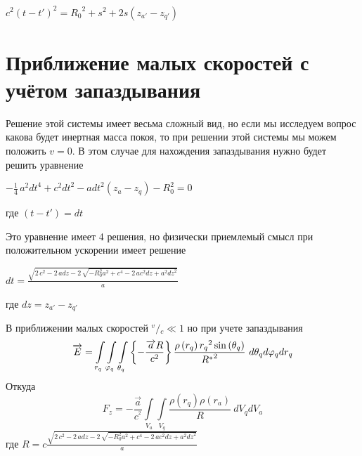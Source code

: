 \documentclass{article}
\begin{document}
$c^{2}\left( t-t' \right)^{2}={{R}_{0}}^{2}+{{s}^{2}}+2s\left( {{z}_{a'}}-{{z}_{q'}} \right)$

\section{Приближение малых скоростей с учётом запаздывания}
Решение этой системы имеет весьма сложный вид, но если мы исследуем вопрос какова будет инертная масса покоя, то при решении этой системы мы можем положить $v = 0$. В этом случае для нахождения запаздывания нужно будет решить уравнение

$-\frac{1}{4} \, a^{2} \mathit{dt}^{4} + c^{2} \mathit{dt}^{2} - a \mathit{dt}^{2} {\left(z_{a} - z_{q}\right)} - R_{0}^{2} = 0$

где
$(t-t') = dt$

Это уравнение имеет 4 решения, но физически приемлемый смысл при положительном ускорении имеет решение




$\mathit{dt} = \frac{\sqrt{2 \, c^{2} - 2 \, a \mathit{dz} - 2 \, \sqrt{-R_{0}^{2} a^{2} + c^{4} - 2 \, a c^{2} \mathit{dz} + a^{2} \mathit{dz}^{2}}}}{a}$

где
$\mathit{dz} = z_{a'} - z_{q'}$


В приближении малых скоростей ${}^{v}/{}_{c}\ll 1$ но при учете запаздывания
\[\overrightarrow{E}=\int\limits_{{{r}_{q}}}\int\limits_{{{\varphi}_{q}}}\int\limits_{{{\theta}_{q}}}\\
{\left\{ -\frac{\overrightarrow{a}R}{{{c}^{2}}} \right\}\frac{\rho \left( {{r}_{q}} \right){{r}_{q}}^{2}\sin \left( {{\theta }_{q}} \right)}{{{R}^{*}}^{2}}\ }d{{\theta }_{q}}d{{\varphi }_{q}}d{{r}_{q}}\]
 Откуда
\[{{F}_{z}}=-\frac{\overrightarrow{a}}{{{c}^{^{2}}}}\int\limits_{{{V}_{a}}}{\int\limits_{{{V}_{q}}}{\frac{\rho \left( {{r}_{q}} \right)\rho \left( {{r}_{a}} \right)}{R}}}\ d{{V}_{q}}d{{V}_{a}}\]
где
$\mathit{R} = c\frac{\sqrt{2 \, c^{2} - 2 \, a \mathit{dz} - 2 \, \sqrt{-R_{0}^{2} a^{2} + c^{4} - 2 \, a c^{2} \mathit{dz} + a^{2} \mathit{dz}^{2}}}}{a}$
\end{document}
